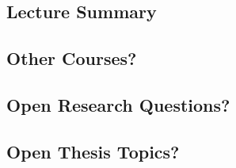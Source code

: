 \subsection{Lecture Summary}
\subsection{Other Courses?}
\subsection{Open Research Questions?}
\subsection{Open Thesis Topics?}
\lessonslearned{
	\item \ldots
}{
	\item \ldots
}{
	\ldots
}

\faq{
	\item \ldots
}{
	\item \ldots
}{
	\item \ldots
}


